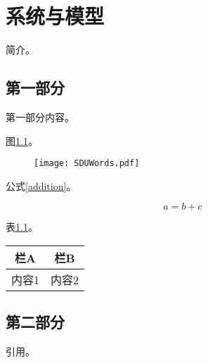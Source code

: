 \chapter{系统与模型}

简介。

\section{第一部分}

第一部分内容。

图\ref{Words}。

\begin{figure}[htbp]
    \centering
    \texttt{[image: SDUWords.pdf]}
    \label{Words}
\end{figure}

公式\ref{addition}。

\begin{equation}
    \label{addition}
    a = b + c
\end{equation}

表\ref{BFTN}。

\begin{table}[ht]
    \label{BFTN}
    \centering
    
    \begin{tabular}{cc}
        \toprule
        \textbf{栏A}  &  \textbf{栏B}  \\
        \midrule
        内容1         & 内容2           \\
        \bottomrule
    \end{tabular}%

\end{table}

\section{第二部分}

引用\cite{On_the_Road_to_6G}。






